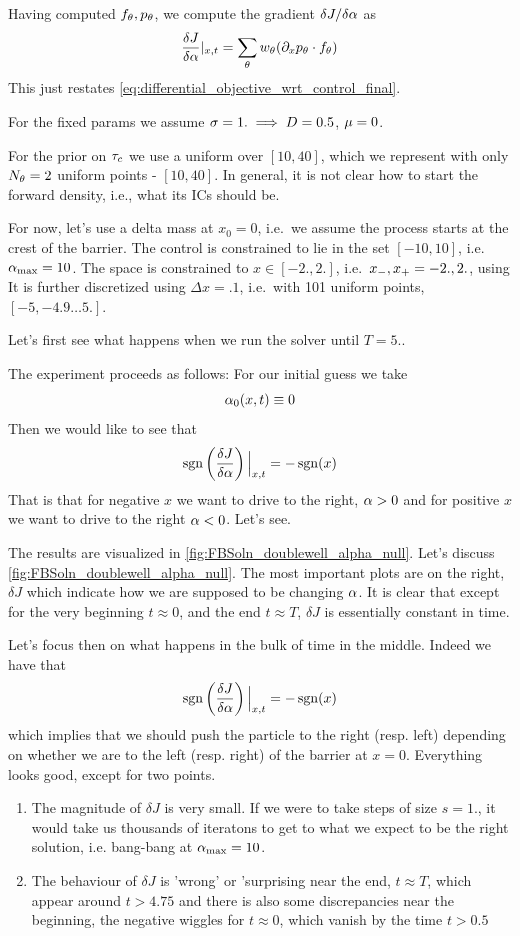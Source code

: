\documentclass{article}
\begin{document}
Having computed ${ f_{\theta}}, { p_{\theta}}$, we compute the gradient $\delta J / \delta {\alpha}$
as
$$
\frac {\delta J}{\delta {\alpha}} |_{x,t} = \sum_{\theta} { w_{\theta} } ({\partial}_x { p_{\theta}} \cdot { f_{\theta}})
$$
This just restates \cref{eq:differential_objective_wrt_control_final}.

For the fixed params we assume ${\sigma } = 1. \implies D = 0.5$, ${\mu } = 0$.


For the prior on ${ \tau_{c} }$ we use a uniform over $[10,40]$, which we represent with
only $N_{\theta} = 2$ uniform points - $[10, 40]$.  In general, it is
not clear how to start the forward density, i.e., what its ICs should be. 

For now, let's use a delta mass at $x_0 = 0$, i.e.\ we assume the process starts
at the crest of the barrier. The control is constrained to lie in the set $[-10, 10]$, i.e.\ ${ {\alpha}_{\textrm{max}} }
= 10$. The space is constrained to $x \in [-2.,2.]$, i.e.\ ${ x_{-} }, { x_{+} } =
-2.,2.$, using  It is further discretized using $\Delta x = .1$, i.e.\ with 101
uniform points, $[-5, -4.9\ldots 5.]$.

Let's first see what happens when we run the solver until $T = 5$..

The experiment proceeds as follows: For our initial guess we take $${\alpha}_0(x,t)
\equiv 0$$ Then we would like to see that 
$$ \operatorname{sgn} \left(\frac {\delta J}{\delta {\alpha}}\right) \Big|_{x,t} = - \operatorname{sgn}(x)$$
That is that for negative $x$ we want to drive to the right, ${\alpha} > 0$ and for
positive $x$ we want to drive to the right ${\alpha} < 0$. 
Let's see.  

The results are visualized in \cref{fig:FBSoln_doublewell_alpha_null}. Let's
discuss \cref{fig:FBSoln_doublewell_alpha_null}. The most important plots are on
the right, $\delta J$ which indicate how we are supposed to be changing ${\alpha}$. 
It is clear that except for the very beginning $t \approx 0$, and the end $t
\approx T$, $\delta J$ is essentially constant in time.  

Let's focus then on what happens in the bulk of time in the middle. Indeed we  
have that 
$$
\operatorname{sgn} \left(\frac {\delta J}{\delta {\alpha}}\right) \Big|_{x,t} = - \operatorname{sgn}(x)
$$
which implies that we should push the particle to the right (resp. left)
depending on whether we are to the left (resp. right) of the barrier at $x=0$.
Everything looks good, except for two points.
\begin{enumerate}
  \item The magnitude of $\delta J$ is very small. If we were to take steps of
  size $s=1.$, it would take us thousands of iteratons to get to what we expect to be
the right solution, i.e. bang-bang at ${ {\alpha}_{\textrm{max}} } = 10$.
\item The behaviour of $\delta J$ is 'wrong' or 'surprising near the end, $t
\approx T$, which appear around $t>4.75$ and there is also some discrepancies
near the beginning, the negative wiggles for $t \approx 0$, which vanish by the
time $t > 0.5$
\end{enumerate}
\end{document}
